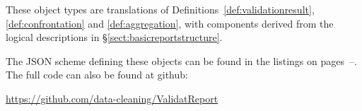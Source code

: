These object types are translations of Definitions~\ref{def:validationresult},
\ref{def:confrontation} and \ref{def:aggregation}, with components derived from
the logical descriptions in \S\ref{sect:basicreportstructure}.

The JSON scheme defining these objects can be found in the listings on
pages~\pageref{lst:valrep1}--\pageref{lst:valrep3}. The full code can also be
found at github:
\begin{center}
\href{https://github.com/data-cleaning/ValidatReport}{https://github.com/data-cleaning/ValidatReport}
\end{center}
%

%
%
\newpage

%


\newpage



